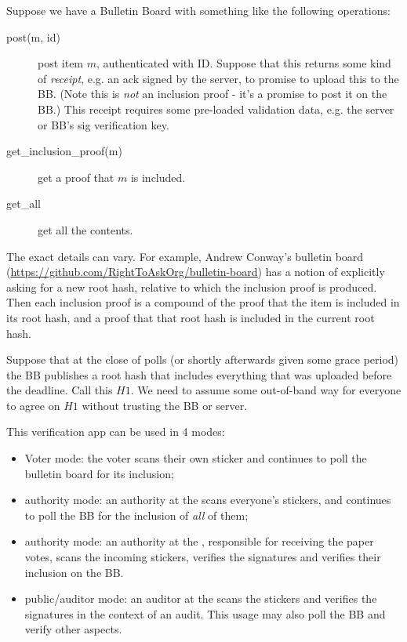 \documentclass{article}
\begin{document}
Suppose we have a Bulletin Board with something like the following operations:
    \begin{description}
        \item[post(m, id)] post item $m$, authenticated with ID. Suppose that this returns some kind of \emph{receipt}, e.g. an ack signed by the server, to promise to upload this to the BB. (Note this is \emph{not} an inclusion proof - it's a promise to post it on the BB.) This receipt requires some pre-loaded validation data, e.g. the server or BB's sig verification key.
        \item[get\_inclusion\_proof(m)] get a proof that $m$ is included.
        \item[get\_all] get all the contents.
    \end{description}
    The exact details can vary. For example, Andrew Conway's bulletin board (\url{https://github.com/RightToAskOrg/bulletin-board})
    has a notion of explicitly asking for a new root hash, relative to which the inclusion proof is produced. Then each
    inclusion proof is a compound of the proof that the item is included in its root hash, and a proof that that root hash
    is included in the current root hash.

    Suppose that at the close of polls (or shortly afterwards given some grace period) the BB publishes a root hash that includes everything that was uploaded before the deadline. Call this $H1$. We need to assume some out-of-band way for everyone to agree on $H1$ without trusting the BB or server.

    This verification app can be used in 4 modes:
    \begin{itemize}
        \item Voter mode: the voter scans their own sticker and continues to poll the bulletin board for its inclusion;
        \item \remoteVotingCenter{} authority mode: an authority at the \remoteVotingCenter{} scans everyone's stickers, and continues to poll the BB for the inclusion of \emph{all} of them;
        \item \localVotingCenter{} authority mode: an authority at the \localVotingCenter{}, responsible for receiving the paper votes, scans the incoming stickers, verifies the signatures and verifies their inclusion on the BB.
        \item \localVotingCenter{} public/auditor mode: an auditor at the \localVotingCenter{} scans the stickers and verifies the signatures in the context of an audit. This usage may also poll the BB and verify other aspects.
    \end{itemize}
\end{document}
